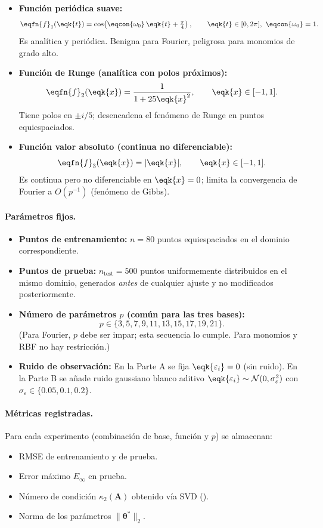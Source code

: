 \begin{itemize}[nosep, leftmargin=1.5em]
  \item \textbf{Función periódica suave:}
    \[
      \eqfn{f}_1(\eqk{t}) = \cos\!\left(\eqcon{\omega_0}\,\eqk{t} + \tfrac{\pi}{4}\right),
      \qquad \eqk{t} \in [0, 2\pi],\ \eqcon{\omega_0}=1.
    \]
    Es analítica y periódica. Benigna para Fourier, peligrosa para monomios de grado alto.

  \item \textbf{Función de Runge (analítica con polos próximos):}
    \[
      \eqfn{f}_2(\eqk{x}) = \frac{1}{1+25\eqk{x}^2},
      \qquad \eqk{x} \in [-1,1].
    \]
    Tiene polos en $\pm i/5$; desencadena el fenómeno de Runge en puntos equiespaciados.

  \item \textbf{Función valor absoluto (continua no diferenciable):}
    \[
      \eqfn{f}_3(\eqk{x}) = |\eqk{x}|,
      \qquad \eqk{x} \in [-1,1].
    \]
    Es continua pero no diferenciable en $\eqk{x}=0$; limita la convergencia de Fourier a $O(p^{-1})$ (fenómeno de Gibbs).
\end{itemize}

\paragraph{Parámetros fijos.}
\begin{itemize}[nosep, leftmargin=1.5em]
  \item \textbf{Puntos de entrenamiento:} $n = 80$ puntos equiespaciados en el dominio correspondiente.
  \item \textbf{Puntos de prueba:} $n_{\mathrm{test}} = 500$ puntos uniformemente distribuidos en el mismo dominio, generados \emph{antes} de cualquier ajuste y no modificados posteriormente.
  \item \textbf{Número de parámetros \(p\) (común para las tres bases):}
    \[
      p \in \{3, 5, 7, 9, 11, 13, 15, 17, 19, 21\}.
    \]
    (Para Fourier, \(p\) debe ser impar; esta secuencia lo cumple. Para monomios y RBF no hay restricción.)
  \item \textbf{Ruido de observación:} En la Parte A se fija $\eqk{\varepsilon_i}=0$ (sin ruido). En la Parte B se añade ruido gaussiano blanco aditivo $\eqk{\varepsilon_i} \sim \mathcal{N}(0,\sigma_\varepsilon^2)$ con $\sigma_\varepsilon \in \{0.05, 0.1, 0.2\}$.
\end{itemize}

\paragraph{Métricas registradas.}
Para cada experimento (combinación de base, función y \(p\)) se almacenan:
\begin{itemize}[nosep, leftmargin=1.5em]
  \item RMSE de entrenamiento y de prueba.
  \item Error máximo $E_\infty$ en prueba.
  \item Número de condición $\kappa_2(\mathbf{A})$ obtenido vía SVD ().
  \item Norma de los parámetros $\|\boldsymbol{\theta}^*\|_2$.
\end{itemize}

